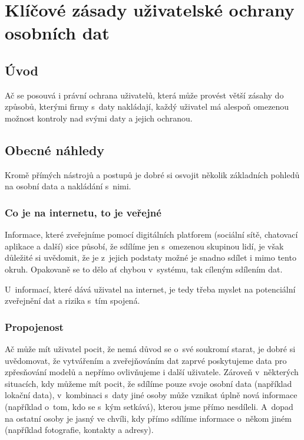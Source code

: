 \chapter{Klíčové zásady uživatelské ochrany osobních dat}

\section*{Úvod}
Ač se posouvá i právní ochrana uživatelů, která může provést větší zásahy do způsobů, kterými firmy s~daty nakládají, každý uživatel má alespoň omezenou možnost kontroly nad svými daty a jejich ochranou.

\section{Obecné náhledy}
Kromě přímých nástrojů a postupů je dobré si osvojit několik základních pohledů na osobní data a nakládání s~nimi.

\subsection{Co je na internetu, to je veřejné}
Informace, které zveřejníme pomocí digitálních platforem (sociální sítě, chatovací aplikace a další) sice působí, že sdílíme jen s~omezenou skupinou lidí, je však důležité si uvědomit, že je z~jejich podstaty možné je snadno sdílet i mimo tento okruh. Opakovaně se to dělo ať chybou v~systému, tak cíleným sdílením dat.

U~informací, které dává uživatel na internet, je tedy třeba myslet na potenciální zveřejnění dat a rizika s~tím spojená.


\subsection{Propojenost}
Ač může mít uživatel pocit, že nemá důvod se o~své soukromí starat, je dobré si uvědomovat, že vytvářením a zveřejňováním dat zaprvé poskytujeme data pro zpřesňování modelů a nepřímo ovlivňujeme i další uživatele. Zároveň v~některých situacích, kdy můžeme mít pocit, že sdílíme pouze svoje osobní data (například lokační data), v~kombinaci s~daty jiné osoby může vznikat úplně nová informace (například o~tom, kdo se s~kým setkává), kterou jsme přímo nesdíleli. A~dopad na ostatní osoby je jasný ve chvíli, kdy přímo sdílíme informace o~někom jiném (například fotografie, kontakty a adresy).  

